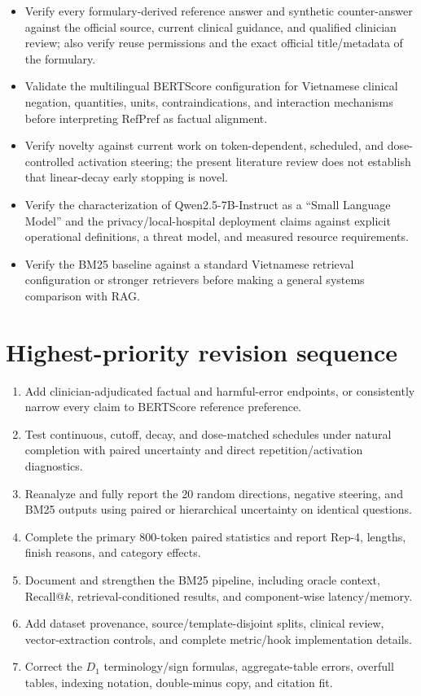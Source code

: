 \documentclass[11pt]{article}
\begin{document}
\begin{itemize}
    \item Verify every formulary-derived reference answer and synthetic counter-answer against the official source, current clinical guidance, and qualified clinician review; also verify reuse permissions and the exact official title/metadata of the formulary.
    \item Validate the multilingual BERTScore configuration for Vietnamese clinical negation, quantities, units, contraindications, and interaction mechanisms before interpreting RefPref as factual alignment.
    \item Verify novelty against current work on token-dependent, scheduled, and dose-controlled activation steering; the present literature review does not establish that linear-decay early stopping is novel.
    \item Verify the characterization of Qwen2.5-7B-Instruct as a ``Small Language Model'' and the privacy/local-hospital deployment claims against explicit operational definitions, a threat model, and measured resource requirements.
    \item Verify the BM25 baseline against a standard Vietnamese retrieval configuration or stronger retrievers before making a general systems comparison with RAG.
\end{itemize}

\section*{Highest-priority revision sequence}

\begin{enumerate}
    \item Add clinician-adjudicated factual and harmful-error endpoints, or consistently narrow every claim to BERTScore reference preference.
    \item Test continuous, cutoff, decay, and dose-matched schedules under natural completion with paired uncertainty and direct repetition/activation diagnostics.
    \item Reanalyze and fully report the 20 random directions, negative steering, and BM25 outputs using paired or hierarchical uncertainty on identical questions.
    \item Complete the primary 800-token paired statistics and report Rep-4, lengths, finish reasons, and category effects.
    \item Document and strengthen the BM25 pipeline, including oracle context, Recall@$k$, retrieval-conditioned results, and component-wise latency/memory.
    \item Add dataset provenance, source/template-disjoint splits, clinical review, vector-extraction controls, and complete metric/hook implementation details.
    \item Correct the $D_1$ terminology/sign formulas, aggregate-table errors, overfull tables, indexing notation, double-minus copy, and citation fit.
\end{enumerate}
\end{document}
